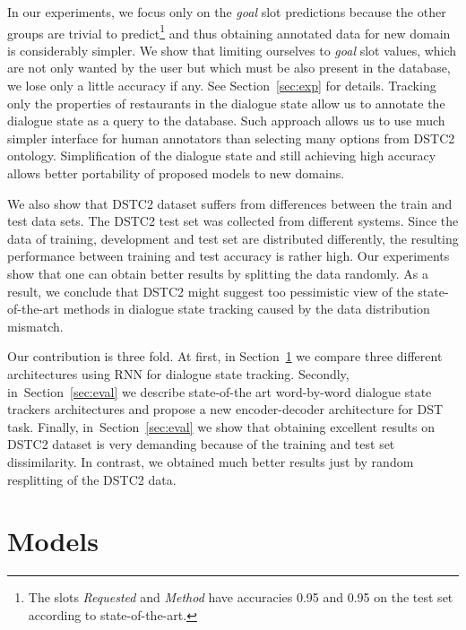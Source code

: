\documentclass{itatnew}
\def\PB#1{\textcolor{red}{PB: \textit{#1}}}
\begin{document}
In our experiments, we focus only on the {\it goal} slot predictions because the other groups are trivial to predict\footnote{The slots {\it Requested} and {\it Method} have accuracies 0.95 and 0.95 on the test set according to state-of-the-art\cite{williams2014web}.} and thus obtaining annotated data for new domain is considerably simpler.
We show that limiting ourselves to {\it goal} slot values, which are not only wanted by the user but which must be also present in the database, we lose only a little accuracy if any.
See Section~\ref{sec:exp} for details.
Tracking only the properties of restaurants in the dialogue state allow us to annotate the dialogue state as a query to the database. Such approach allows us to use much simpler interface for human annotators than selecting many options from DSTC2 ontology.
Simplification of the dialogue state and still achieving high accuracy allows better portability of proposed models to new domains.

We also show that DSTC2 dataset suffers from differences between the train and test data sets.
The DSTC2 test set was collected from different systems\cite{henderson2014second}.
Since the data of training, development and test set are distributed differently, the resulting performance between training and test accuracy is rather high.
Our experiments show that one can obtain better results by splitting the data randomly.
As a result, we conclude that DSTC2 might suggest too pessimistic view of the state-of-the-art methods in dialogue state tracking caused by the data distribution mismatch.

Our contribution is three fold. 
At first, in Section~\ref{sec:model} we compare three different architectures using RNN for dialogue state tracking.
Secondly, in~Section~\ref{sec:eval} we describe state-of-the art word-by-word dialogue state trackers architectures and propose a new encoder-decoder architecture for DST task.
Finally, in~Section~\ref{sec:eval} we show that obtaining excellent results on DSTC2 dataset is very demanding because of the training and test set dissimilarity. In contrast, we obtained much better results just by random resplitting of the DSTC2 data.

\section{Models}
\label{sec:model}
\end{document}
